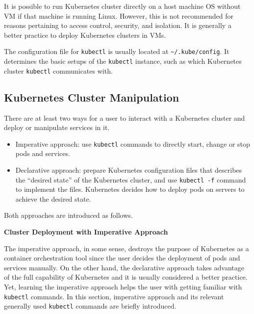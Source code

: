 It is possible to run Kubernetes cluster directly on a host machine OS without VM if that machine is running Linux. However, this is not recommended for reasons pertaining to access control, security, and isolation. It is generally a better practice to deploy Kubernetes clusters in VMs.

The configuration file for \verb|kubectl| is usually located at \verb|~/.kube/config|. It determines the basic setups of the \verb|kubectl| instance, such as which Kubernetes cluster \verb|kubectl| communicates with.

\subsection{Kubernetes Cluster Manipulation}

There are at least two ways for a user to interact with a Kubernetes cluster and deploy or manipulate services in it.
\begin{itemize}
  \item Imperative approach: use \verb|kubectl| commands to directly start, change or stop pods and services.
  \item Declarative approach: prepare Kubernetes configuration files that describes the ``desired state'' of the Kubernetes cluster, and use \verb|kubectl -f| command to implement the files. Kubernetes decides how to deploy pods on servers to achieve the desired state.
\end{itemize}
Both approaches are introduced as follows. 

\vspace{0.1in}
\noindent \textbf{Cluster Deployment with Imperative Approach}
\vspace{0.1in}

The imperative approach, in some sense, destroys the purpose of Kubernetes as a container orchestration tool since the user decides the deployment of pods and services manually. On the other hand, the declarative approach takes advantage of the full capability of Kubernetes and it is usually considered a better practice. Yet, learning the imperative approach helps the user with getting familiar with \verb|kubectl| commands. In this section, imperative approach and its relevant generally used \verb|kubectl| commands are briefly introduced.

